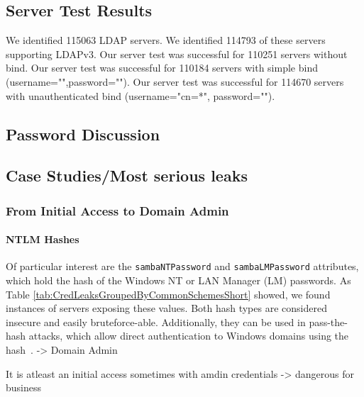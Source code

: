 \subsection{Server Test Results}

We identified 115063 LDAP servers.
We identified 114793 of these servers supporting LDAPv3.
Our server test was successful for 110251 servers without bind.
Our server test was successful for 110184 servers with simple bind (username="",password="").
Our server test was successful for 114670 servers with unauthenticated bind (username="cn=*", password="").

\subsection{Password Discussion}



\subsection{Case Studies/Most serious leaks}

\subsubsection{From Initial Access to Domain Admin}
\label{subsub:FromInitalAccessToDomainAdmin}

\paragraph{NTLM Hashes}
Of particular interest are the \texttt{sambaNTPassword} and \texttt{sambaLMPassword} attributes, which hold the hash of the Windows NT or LAN Manager (LM) passwords. As Table \ref{tab:CredLeaksGroupedByCommonSchemesShort} showed, we found  instances of servers exposing these values. Both hash types are considered insecure  and easily bruteforce-able. Additionally, they can be used in pass-the-hash attacks, which allow direct authentication to Windows domains using the hash~. -> Domain Admin


It is atleast an initial access sometimes with amdin credentials -> dangerous for business

